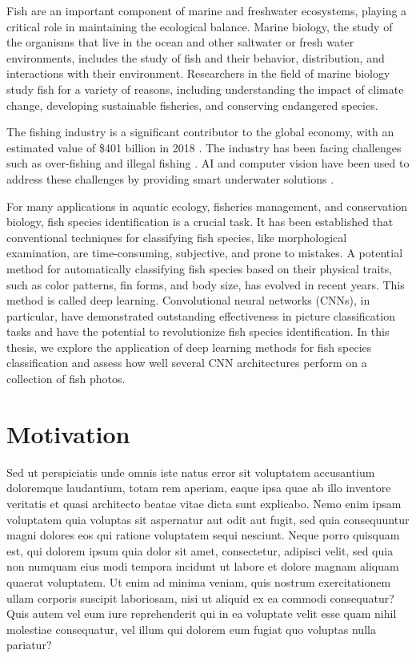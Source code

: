 

Fish are an important component of marine and freshwater ecosystems, playing a critical role in maintaining the ecological balance. Marine biology, the study of the organisms that live in the ocean and other saltwater or fresh water environments, includes the study of fish and their behavior, distribution, and interactions with their environment. Researchers in the field of marine biology study fish for a variety of reasons, including understanding the impact of climate change, developing sustainable fisheries, and conserving endangered species. 

The fishing industry is a significant contributor to the global economy, with an estimated value of \$401 billion in 2018 \cite{saleh2022computer}. The industry has been facing challenges such as over-fishing and illegal fishing \cite{saleh2022computer}. AI and computer vision have been used to address these challenges by providing smart underwater solutions \cite{zhao2021application}.

For many applications in aquatic ecology, fisheries management, and conservation biology, fish species identification is a crucial task. It has been established that conventional techniques for classifying fish species, like morphological examination, are time-consuming, subjective, and prone to mistakes. A potential method for automatically classifying fish species based on their physical traits, such as color patterns, fin forms, and body size, has evolved in recent years. This method is called deep learning. Convolutional neural networks (CNNs), in particular, have demonstrated outstanding effectiveness in picture classification tasks and have the potential to revolutionize fish species identification. In this thesis, we explore the application of deep learning methods for fish species classification and assess how well several CNN architectures perform on a collection of fish photos.

\section{Motivation}

Sed ut perspiciatis unde omnis iste natus error sit voluptatem accusantium doloremque laudantium, totam rem aperiam, eaque ipsa quae ab illo inventore veritatis et quasi architecto beatae vitae dicta sunt explicabo. Nemo enim ipsam voluptatem quia voluptas sit aspernatur aut odit aut fugit, sed quia consequuntur magni dolores eos qui ratione voluptatem sequi nesciunt. Neque porro quisquam est, qui dolorem ipsum quia dolor sit amet, consectetur, adipisci velit, sed quia non numquam eius modi tempora incidunt ut labore et dolore magnam aliquam quaerat voluptatem. Ut enim ad minima veniam, quis nostrum exercitationem ullam corporis suscipit laboriosam, nisi ut aliquid ex ea commodi consequatur? Quis autem vel eum iure reprehenderit qui in ea voluptate velit esse quam nihil molestiae consequatur, vel illum qui dolorem eum fugiat quo voluptas nulla pariatur? \\

